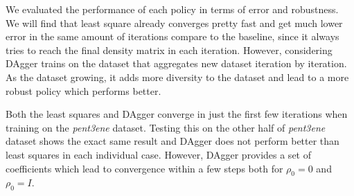\documentclass[twoside,11pt]{article}
\begin{document}
We evaluated the performance of each policy in terms of error and robustness. We will find that least square already converges pretty fast and get much lower error in the same amount of iterations compare to the baseline, since it always tries to reach the final density matrix in each iteration. However, considering DAgger trains on the dataset that aggregates new dataset iteration by iteration. As the dataset growing, it adds more diversity to the dataset and lead to a more robust policy which performs better.

Both the least squares and DAgger converge in just the first few iterations when training on the \textit{pent3ene} dataset. Testing this on the other half of \textit{pent3ene} dataset shows the exact same result and DAgger does not perform better than least squares in each individual case. However, DAgger provides a set of coefficients which lead to convergence within a few steps both for $\rho_0 = 0$ and $\rho_0 = I$.
\end{document}
